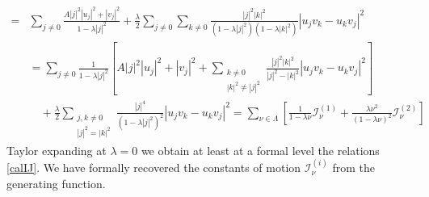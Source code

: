 \documentclass[reqno,11pt]{amsart}
\theoremstyle{plain}
\numberwithin{equation}{section}
\newcommand{\I}{{\texttt{\bf J}}}
\newcommand{\cI}{{\mathcal I}}
\begin{document}
{\[\begin{aligned}
	\\= & \sum_{j \neq 0}  \frac{ A |j|^2  |u_j|^2+|v_j|^2}{1 - \lambda |j|^2} + \frac{\lambda}{2} \sum_{j \neq 0} \sum_{k \neq 0} \frac{|j|^2 |k|^2}{(1 - \lambda |j|^2)(1 - \lambda |k|^2)} |u_j v_k - u_k v_j|^2\\
	&= \sum_{j \neq 0} \frac{1}{1 - \lambda |j|^2} \left[ A |j|^2 |u_j|^2 + |v_j|^2 + \sum_{\substack{k \neq 0 \\ |k|^2 \neq |j|^2}} \frac{|j|^2 |k|^2}{|j|^2 - |k|^2} |u_j v_k - u_k v_j|^2 \right] \\
	&\quad + \frac{\lambda}{2} \sum_{\substack{j, k \neq 0 \\ |j|^2 = |k|^2}} \frac{|j|^4}{(1 - \lambda |j|^2)^2} |u_j v_k - u_k v_j|^2=\sum_{\nu \in \Lambda} \left[ \frac{1}{1 - \lambda \nu} \mathcal I_\nu^{(1)} + \frac{\lambda \nu^2}{(1 - \lambda \nu)^2} \mathcal I_\nu^{(2)} \right]
\end{aligned}
\]
Taylor expanding at $\lambda=0$ we obtain at least at a formal level the relations \eqref{calIJ}.
We have formally recovered the constants of motion $\cI_\nu^{(i)}$ from the generating function.
%
}
\end{document}
